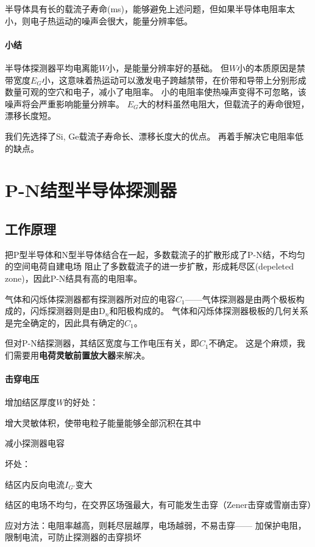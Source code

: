 半导体具有长的载流子寿命(ms)，能够避免上述问题，但如果半导体电阻率太小，则电子热运动的噪声会很大，能量分辨率低。
\paragraph{小结}
半导体探测器平均电离能$W$小，是能量分辨率好的基础。
但$W$小的本质原因是禁带宽度$E_G$小，这意味着热运动可以激发电子跨越禁带，在价带和导带上分别形成数量可观的空穴和电子，减小了电阻率。
小的电阻率使热噪声变得不可忽略，该噪声将会严重影响能量分辨率。
$E_G$大的材料虽然电阻大，但载流子的寿命很短，漂移长度短。

我们先选择了Si, Ge载流子寿命长、漂移长度大的优点。
再着手解决它电阻率低的缺点。

\section{P-N结型半导体探测器}

\subsection{工作原理}

把P型半导体和N型半导体结合在一起，多数载流子的扩散形成了P-N结，不均匀的空间电荷自建电场
阻止了多数载流子的进一步扩散，形成耗尽区(depeleted zone)，因此P-N结具有高的电阻率。

气体和闪烁体探测器都有探测器所对应的电容$C_1$——气体探测器是由两个极板构成的，闪烁探测器则是由D$_n$和阳极构成的。%
气体和闪烁体探测器极板的几何关系是完全确定的，因此具有确定的$C_1$。

但对P-N结探测器，其结区宽度与工作电压有关，即$C_1$不确定。
这是个麻烦，我们需要用\textbf{电荷灵敏前置放大器}来解决。
\paragraph{击穿电压}
增加结区厚度$W$的好处：
\begin{compactitem}
	\item 增大灵敏体积，使带电粒子能量能够全部沉积在其中
	\item 减小探测器电容
\end{compactitem}
坏处：
\begin{compactenum}
	\item 结区内反向电流$I_{G'}$变大
	\item 结区的电场不均匀，在交界区场强最大，有可能发生击穿（Zener击穿或雪崩击穿）
\end{compactenum}
应对方法：电阻率越高，则耗尽层越厚，电场越弱，不易击穿——
加保护电阻，限制电流，可防止探测器的击穿损坏

